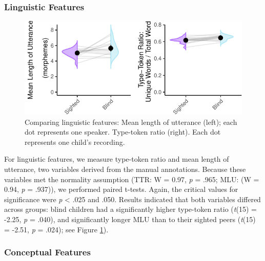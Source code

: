 \documentclass[
  man]{apa6}
\begin{document}
\hypertarget{linguistic-features-1}{%
\subsubsection{Linguistic Features}\label{linguistic-features-1}}

\begin{figure}
\centering
\includegraphics{input_quality_manuscript_files/figure-latex/linguistic-plots-1.pdf}
\caption{\label{fig:linguistic-plots}Comparing linguistic features: Mean length of utterance (left); each dot represents one speaker. Type-token ratio (right). Each dot represents one child's recording.}
\end{figure}

For linguistic features, we measure type-token ratio and mean length of utterance, two variables derived from the manual annotations. Because these variables met the normality assumption (TTR: W = 0.97, \emph{p} = .965; MLU: (W = 0.94, \emph{p} = .937)), we performed paired t-tests. Again, the critical values for significance were \emph{p} \textless{} .025 and .050. Results indicated that both variables differed across groups: blind children had a significantly higher type-token ratio (\emph{t}(15) = -2.25, \emph{p} = .040), and significantly longer MLU than to their sighted peers (\emph{t}(15) = -2.51, \emph{p} = .024); see Figure \ref{fig:linguistic-plots}).

\hypertarget{conceptual-features-1}{%
\subsubsection{Conceptual Features}\label{conceptual-features-1}}
\end{document}
